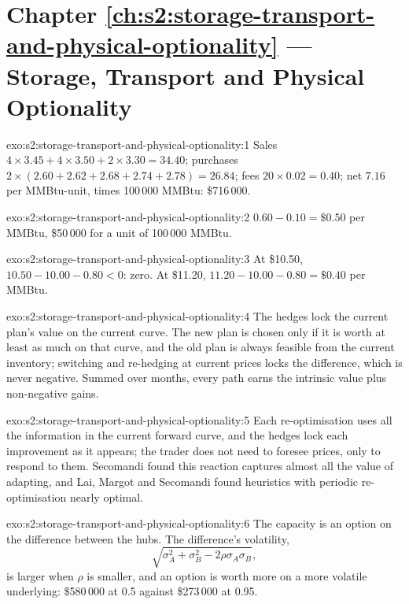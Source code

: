 \section*{Chapter \ref{ch:s2:storage-transport-and-physical-optionality} --- Storage, Transport and Physical Optionality}

\begin{solution}{exo:s2:storage-transport-and-physical-optionality:1}
Sales $4 \times 3.45 + 4 \times 3.50 + 2 \times 3.30 = 34.40$; purchases $2 \times (2.60 + 2.62 + 2.68 + 2.74 + 2.78) = 26.84$; fees $20 \times 0.02
= 0.40$; net $7.16$ per MMBtu-unit, times 100\,000 MMBtu: \$716\,000.
\end{solution}

\begin{solution}{exo:s2:storage-transport-and-physical-optionality:2}
$0.60 - 0.10 = \$0.50$ per MMBtu, \$50\,000 for a unit of 100\,000 MMBtu.
\end{solution}

\begin{solution}{exo:s2:storage-transport-and-physical-optionality:3}
At \$10.50, $10.50 - 10.00 - 0.80 < 0$: zero. At \$11.20, $11.20 - 10.00 - 0.80 = \$0.40$ per MMBtu.
\end{solution}

\begin{solution}{exo:s2:storage-transport-and-physical-optionality:4}
The hedges lock the current plan's value on the current curve. The new plan is chosen only if it is worth at least as much on that curve, and the old
plan is always feasible from the current inventory; switching and re-hedging at current prices locks the difference, which is never negative. Summed
over months, every path earns the intrinsic value plus non-negative gains.
\end{solution}

\begin{solution}{exo:s2:storage-transport-and-physical-optionality:5}
Each re-optimisation uses all the information in the current forward curve, and the hedges lock each improvement as it appears; the trader does not
need to foresee prices, only to respond to them. Secomandi found this reaction captures almost all the value of adapting, and Lai, Margot and
Secomandi found heuristics with periodic re-optimisation nearly optimal.
\end{solution}

\begin{solution}{exo:s2:storage-transport-and-physical-optionality:6}
The capacity is an option on the difference between the hubs. The difference's volatility,
\[\sqrt{\sigma_A^2 + \sigma_B^2 - 2\rho\sigma_A\sigma_B},\]
is larger when $\rho$ is smaller, and an option is worth more on a more volatile underlying: \$580\,000 at 0.5 against \$273\,000 at 0.95.
\end{solution}

